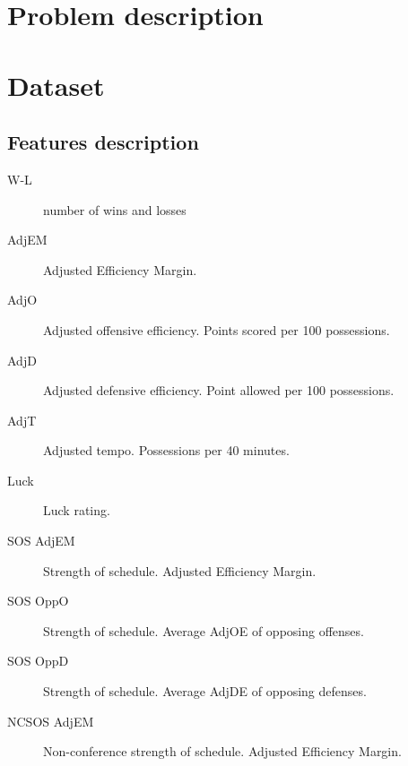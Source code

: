 \documentclass[
10pt, %
a4paper, %
oneside, %
headinclude,footinclude, %
BCOR5mm, %
]{scrartcl}
\begin{document}





\section{Problem description}
 


\section{Dataset}
\subsection{Features description}
\begin{description}
\item [W-L]number of wins and losses
\item [AdjEM] Adjusted Efficiency Margin.
\item [AdjO] Adjusted offensive efficiency. Points scored per 100 possessions.
\item [AdjD] Adjusted defensive efficiency. Point allowed per 100 possessions.
\item [AdjT] Adjusted tempo. Possessions per 40 minutes.
\item [Luck] Luck rating.
\item [SOS AdjEM] Strength of schedule. Adjusted Efficiency Margin.
\item [SOS OppO] Strength of schedule. Average AdjOE of opposing offenses.
\item [SOS OppD] Strength of schedule. Average AdjDE of opposing defenses.
\item [NCSOS AdjEM] Non-conference strength of schedule. Adjusted Efficiency Margin.
\end{description}
\end{document}
